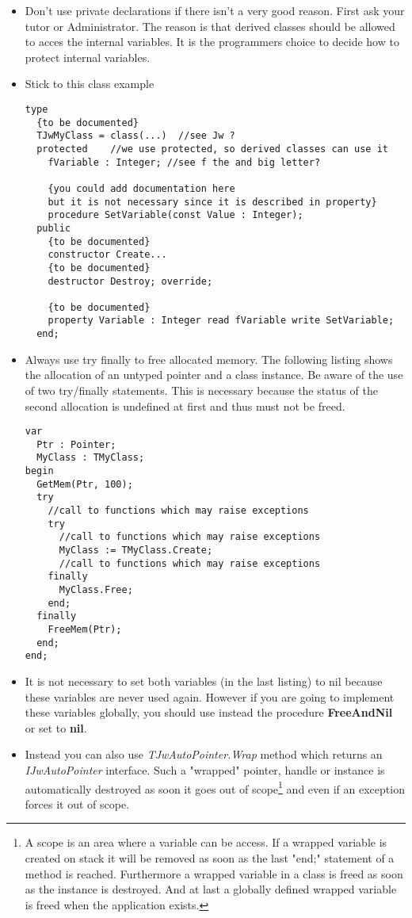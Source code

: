 \documentclass[a4paper,twoside,10pt]{report}
\begin{document}
\begin{itemize}
	\item Don't use private declarations if there isn't a very good reason. First ask your tutor or Administrator. The reason is that derived classes should be allowed to acces the internal variables. It is the programmers choice to decide how to protect internal variables.
	\item Stick to this class example 
\begin{lstlisting}	
type
  {to be documented}
  TJwMyClass = class(...)  //see Jw ?
  protected    //we use protected, so derived classes can use it
    fVariable : Integer; //see f the and big letter?

    {you could add documentation here
    but it is not necessary since it is described in property}
    procedure SetVariable(const Value : Integer);
  public
    {to be documented}
    constructor Create...
    {to be documented}
    destructor Destroy; override;

    {to be documented}
    property Variable : Integer read fVariable write SetVariable;
  end;	
\end{lstlisting}
 
\item Always use try finally to free allocated memory. The following listing shows the allocation of an untyped pointer and a class instance. Be aware of the use of two try/finally statements. This is necessary because the status of the second allocation is undefined at first and thus must not be freed.

\begin{lstlisting}
var 
  Ptr : Pointer;
  MyClass : TMyClass;
begin
  GetMem(Ptr, 100);
  try
    //call to functions which may raise exceptions
    try
      //call to functions which may raise exceptions
      MyClass := TMyClass.Create;
      //call to functions which may raise exceptions
    finally
      MyClass.Free;
    end;
  finally
    FreeMem(Ptr);
  end;
end;
\end{lstlisting}

\item It is not necessary to set both variables (in the last listing) to nil because these variables are never used again. However if you are going to implement these variables globally, you should use instead the procedure \textbf{FreeAndNil} or set to \textbf{nil}.

\item Instead you can also use \textit{TJwAutoPointer.Wrap} method which returns an \textit{IJwAutoPointer} interface. Such a "wrapped" pointer, handle or instance is automatically destroyed as soon it goes out of scope\footnote{A scope is an area where a variable can be access. If a wrapped variable is created on stack it will be removed as soon as the last "end;" statement of a method is reached. Furthermore a wrapped variable in a class is freed as soon as the instance is destroyed. And at last a globally defined wrapped variable is freed when the application exists.} and even if an exception forces it out of scope.


\end{itemize}
\end{document}
